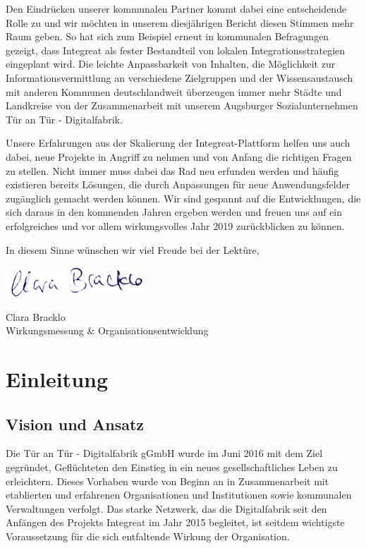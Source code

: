 \documentclass[12pt, a4paper]{article} %
\begin{document}
Den Eindrücken unserer kommunalen Partner kommt dabei eine entscheidende
Rolle zu und wir möchten in unserem diesjährigen Bericht diesen Stimmen
mehr Raum geben. So hat sich zum Beispiel erneut in kommunalen
Befragungen gezeigt, dass Integreat als fester Bestandteil von lokalen
Integrationsstrategien eingeplant wird. Die leichte Anpassbarkeit von
Inhalten, die Möglichkeit zur Informationsvermittlung an verschiedene
Zielgruppen und der Wissensaustausch mit anderen Kommunen
deutschlandweit überzeugen immer mehr Städte und Landkreise von der
Zusammenarbeit mit unserem Augsburger Sozialunternehmen Tür an Tür -
Digitalfabrik.

Unsere Erfahrungen aus der Skalierung der Integreat-Plattform helfen uns
auch dabei, neue Projekte in Angriff zu nehmen und von Anfang die
richtigen Fragen zu stellen. Nicht immer muss dabei das Rad neu erfunden
werden und häufig existieren bereits Lösungen, die durch Anpassungen für
neue Anwendungsfelder zugänglich gemacht werden können. Wir sind
gespannt auf die Entwicklungen, die sich daraus in den kommenden Jahren
ergeben werden und freuen uns auf ein erfolgreiches und vor allem
wirkungsvolles Jahr 2019 zurückblicken zu können.

In diesem Sinne wünschen wir viel Freude bei der Lektüre,

\includegraphics[width=2.03896in]{figure/Unterschrift_clara.jpg}

Clara Bracklo\\
Wirkungsmessung \& Organisationsentwicklung

\hypertarget{einleitung}{%
\section{Einleitung}\label{einleitung}}

\hypertarget{vision-und-ansatz}{%
\subsection{Vision und Ansatz}\label{vision-und-ansatz}}

Die Tür an Tür - Digitalfabrik gGmbH wurde im Juni 2016 mit dem Ziel
gegründet, Geflüchteten den Einstieg in ein neues gesellschaftliches
Leben zu erleichtern. Dieses Vorhaben wurde von Beginn an in
Zusammenarbeit mit etablierten und erfahrenen Organisationen und
Institutionen sowie kommunalen Verwaltungen verfolgt. Das starke
Netzwerk, das die Digitalfabrik seit den Anfängen des Projekts Integreat
im Jahr 2015 begleitet, ist seitdem wichtigste Voraussetzung für die
sich entfaltende Wirkung der Organisation.
\end{document}
